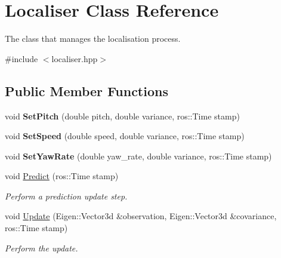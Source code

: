 \hypertarget{classLocaliser}{}\section{Localiser Class Reference}
\label{classLocaliser}


The class that manages the localisation process.  




{\ttfamily \#include $<$localiser.\+hpp$>$}

\subsection*{Public Member Functions}
\begin{DoxyCompactItemize}
\item 
\mbox{\label{classLocaliser_a1e72dc8f361cd5f00da091b643e9559f}} 
void {\bfseries Set\+Pitch} (double pitch, double variance, ros\+::\+Time stamp)
\item 
\mbox{\label{classLocaliser_afa9a61082990c70753d1f9f99e2cd399}} 
void {\bfseries Set\+Speed} (double speed, double variance, ros\+::\+Time stamp)
\item 
\mbox{\label{classLocaliser_a59f0010ddd53fda3de767b5b7326e216}} 
void {\bfseries Set\+Yaw\+Rate} (double yaw\+\_\+rate, double variance, ros\+::\+Time stamp)
\item 
void \hyperlink{classLocaliser_abade968177dc4e68313125ef2bd57756}{Predict} (ros\+::\+Time stamp)
\begin{DoxyCompactList}\small\item\em Perform a prediction update step. \end{DoxyCompactList}\item 
\mbox{\label{classLocaliser_a7907cc8b36f2495f3cb6cde2f3bc3ab1}} 
void \hyperlink{classLocaliser_a7907cc8b36f2495f3cb6cde2f3bc3ab1}{Update} (Eigen\+::\+Vector3d \&observation, Eigen\+::\+Vector3d \&covariance, ros\+::\+Time stamp)
\begin{DoxyCompactList}\small\item\em Perform the update. \end{DoxyCompactList}\end{DoxyCompactItemize}
